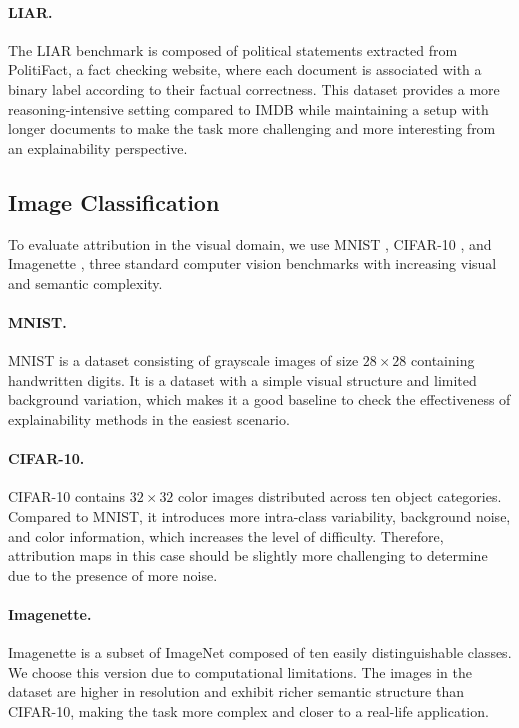 \paragraph{LIAR.}
The LIAR benchmark \cite{politifact} is composed of political statements extracted from PolitiFact, a fact checking website, where each document is associated with a binary label according to their factual correctness. This dataset provides a more reasoning-intensive setting compared to IMDB while maintaining a setup with longer documents to make the task more challenging and more interesting from an explainability perspective.


\subsection{Image Classification}

To evaluate attribution in the visual domain, we use MNIST \cite{mnist}, CIFAR-10 \cite{cifar10}, and Imagenette \cite{imagenette}, three standard computer vision benchmarks with increasing visual and semantic complexity.

\paragraph{MNIST.}
MNIST \cite{mnist} is a dataset consisting of grayscale images of size $28 \times 28$ containing handwritten digits. It is a dataset with a simple visual structure and limited background variation, which makes it a good baseline to check the effectiveness of explainability methods in the easiest scenario.

\paragraph{CIFAR-10.}
CIFAR-10 \cite{cifar10} contains $32 \times 32$ color images distributed across ten object categories. Compared to MNIST, it introduces more intra-class variability, background noise, and color information, which increases the level of difficulty. Therefore, attribution maps in this case should be slightly more challenging to determine due to the presence of more noise.

\paragraph{Imagenette.}
Imagenette \cite{imagenette} is a subset of ImageNet \cite{imagenet} composed of ten easily distinguishable classes. We choose this version due to computational limitations. The images in the dataset are higher in resolution and exhibit richer semantic structure than CIFAR-10, making the task more complex and closer to a real-life application.


